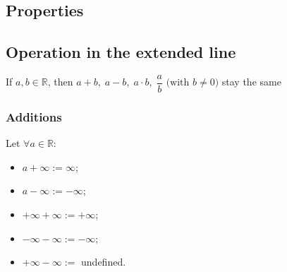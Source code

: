 \documentclass{article}
\begin{document}

\subsection{Properties}

\subsection{Operation in the extended line}
If $a,b \in \mathbb{R}$, then $a+b,\; a-b,\; a\cdot b,\; \dfrac{a}{b} \text{ (with } b\neq 0 )$ stay the same

\subsubsection{Additions}
Let $\forall a \in \mathbb{R}$:
\begin{itemize}
    \item $a+\infty := \infty$;
    \item $a-\infty := -\infty$;
    \item $+\infty + \infty := +\infty$;
    \item $-\infty - \infty := -\infty$;
    \item $+\infty - \infty :=$ undefined.
\end{itemize}
\end{document}
